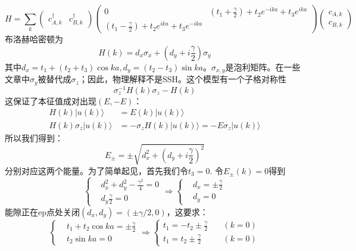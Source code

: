 \documentclass{article}
\begin{document}
\begin{equation}
    H=\sum_{k}\begin{pmatrix}
        c_{A,k}^\dagger&c_{B,k}^\dagger
    \end{pmatrix}\begin{pmatrix}
        0&(t_1+\frac{\gamma}{2})+t_2e^{-ika}+t_3e^{ika}\\
        (t_1-\frac{\gamma}{2})+t_2e^{ika}+t_3e^{-ika}
    \end{pmatrix}\begin{pmatrix}
        c_{A,k}\\
        c_{B,k}
    \end{pmatrix}
\end{equation}
布洛赫哈密顿为
\begin{equation}
    H(k)=d_x\sigma_x+(d_y+i\frac{\gamma}{2})\sigma_y
\end{equation}
其中$d_x=t_1+(t_2+t_3)\cos ka,d_y=(t_2-t_3)\sin ka$。$\sigma_{x,y}$是泡利矩阵。在一些文章中$\sigma_y$被替代成$\sigma_z$；因此，物理解释不是SSH。这个模型有一个子格对称性
\begin{equation}
    \sigma_z^{-1}H(k)\sigma_{z}-H(k)
\end{equation}
这保证了本征值成对出现$(E,-E)$：
\begin{equation}
    \begin{split}
        H(k)|u(k)\rangle&=E(k)|u(k)\rangle\\
        H(k)\sigma_z|u(k)\rangle&=-\sigma_z H(k)|u(k)\rangle=-E\sigma_z|u(k)\rangle
    \end{split}
\end{equation}
所以我们得到：
\begin{equation}
    E_{\pm}=\pm\sqrt{d_x^2+(d_y+i\frac{\gamma}{2})^2}
\end{equation}
分别对应这两个能量。为了简单起见，首先我们令$t_3=0$. 令$E_{\pm}(k)=0$得到
\begin{equation}
    \begin{cases}
        &d_x^2+d_y^2-\frac{\gamma^2}{4}=0\\
        &d_y\frac{\gamma}{2}=0
    \end{cases}\Longrightarrow \begin{cases}
        &d_x=\pm\frac{\gamma}{2}\\
        &d_y=0
    \end{cases}
\end{equation}
能隙正在ep点处关闭$(d_x,d_y)=(\pm\gamma/2,0)$，这要求：
\begin{equation}
    \begin{cases}
        &t_1+t_2\cos ka=\pm\frac{\gamma}{2}\\
        &t_2\sin ka=0
    \end{cases}\Longrightarrow\begin{cases}
        t_1=-t_2\pm\frac{\gamma}{2}\quad&(k=0)\\
        t_1=t_2\pm\frac{\gamma}{2}\quad&(k=0)
    \end{cases}
\end{equation}
\end{document}
